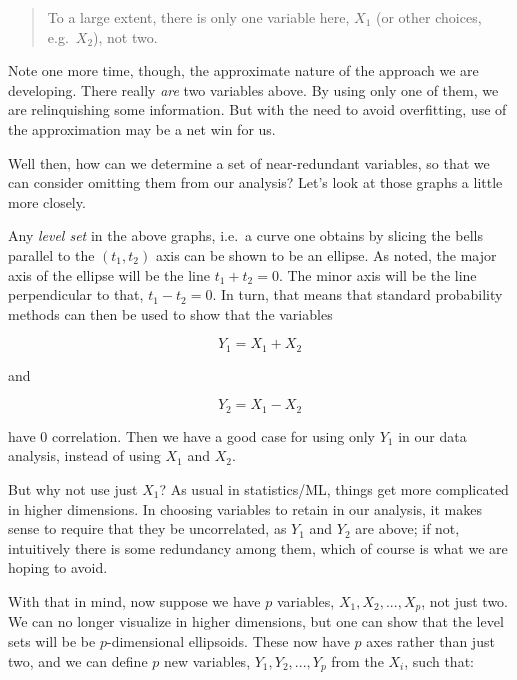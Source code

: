 \begin{quote}

To a large extent, there is only one variable here, $X_1$ (or other
choices, e.g.\ $X_2$), not two.  

\end{quote}

Note one more time, though, the approximate nature of the approach we
are developing.  There really \textit{are} two variables above.  By
using only one of them, we are relinquishing some information.  But with
the need to avoid overfitting, use of the approximation may be a net win
for us.

Well then, how can we determine a set of near-redundant variables, so
that we can consider omitting them from our analysis?  Let's look at
those graphs a little more closely.

Any \textit{level set} in the above graphs, i.e.\ a curve one
obtains by slicing the bells parallel to the $(t_1,t_2)$ axis can be
shown to be an ellipse.  As noted, the major axis of the ellipse will be
the line $t_1 + t_2 = 0$.  The minor axis will be the line perpendicular
to that, $t_1 - t_2 = 0$.  In turn, that means that standard probability
methods can then be used to show that the variables

\begin{equation}
Y_1 = X_1 + X_2 
\end{equation}

and 

\begin{equation}
Y_2 = X_1 - X_2 
\end{equation}

have 0 correlation.  Then we have a good case for using only $Y_1$ in
our data analysis, instead of using $X_1$ and $X_2$.  

But why not use just $X_1$?  As usual in statistics/ML, things get more
complicated in higher dimensions.  In choosing variables to retain in
our analysis, it makes sense to require that they be uncorrelated, as
$Y_1$ and $Y_2$ are above; if not, intuitively there is some redundancy
among them, which of course is what we are hoping to avoid.  

With that in mind, now suppose we have $p$ variables, $X_1,
X_2,...,X_p$, not just two.  We can no longer visualize in higher
dimensions, but one can show that the level sets will be be
$p$-dimensional ellipsoids.  These now have $p$ axes rather than just
two, and we can define $p$ new variables, $Y_1,Y_2,...,Y_p$ from the
$X_i$, such that:

